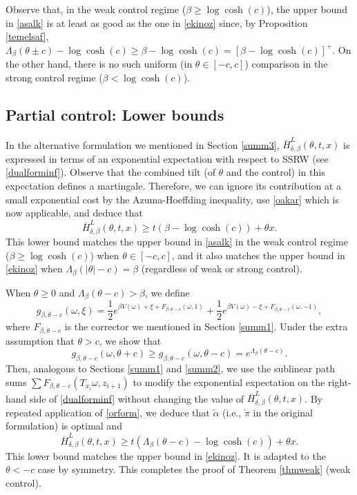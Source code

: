 \documentclass[a4paper]{amsart}
\numberwithin{equation}{section}
\theoremstyle{plain}
\theoremstyle{remark}
\begin{document}
Observe that, in the weak control regime ($\beta\ge\log\cosh(c)$), the 
upper bound in \eqref{asalk} is at least as good as the one in \eqref{ekinoz} 
since,
{}{by Proposition \ref{temelsaf},}
$\Lambda_\beta(\theta \pm c) - \log\cosh(c) \ge \beta - \log\cosh(c) = [\beta - \log\cosh(c)]^+$. On the other hand, there is no such uniform (in $\theta\in[-c,c]$) comparison in the strong control regime ($\beta<\log\cosh(c)$).

\subsection{Partial control: Lower bounds}

In the alternative formulation we mentioned in Section \ref{summ3}, $\overline H_{\delta,\beta}^L(\theta,t,x)$ is expressed in terms of an exponential expectation with respect to SSRW (see \eqref{dualforminf}). Observe that the combined tilt (of $\theta$ and the control) in this expectation defines a martingale. Therefore, we can ignore its contribution at a small exponential cost by the Azuma-Hoeffding inequality, use \eqref{oakar} which is now applicable, and deduce that
$$\overline H_{\delta,\beta}^L(\theta,t,x) \ge t(\beta - \log\cosh(c)) + \theta x.$$
This lower bound matches the upper bound in \eqref{asalk} in the weak control regime ($\beta\ge\log\cosh(c)$) when $\theta\in[-c,c]$, and it also matches the upper bound in \eqref{ekinoz} when $\Lambda_\beta(|\theta| - c) = \beta$ (regardless of weak or strong control).

When $\theta\ge0$ and $\Lambda_\beta(\theta-c)>\beta$, we define
$$g_{\beta,\theta-c}(\omega,\xi) = \frac1{2}e^{\beta V(\omega) + \xi + F_{\beta,\theta-c}(\omega,1)} + \frac1{2}e^{\beta V(\omega) - \xi + F_{\beta,\theta-c}(\omega,-1)},$$
where $F_{\beta,\theta-c}$ is the corrector we mentioned in Section \ref{summ1}. Under the extra assumption that $\theta>c$, we show that
\begin{equation}\label{orform}
g_{\beta,\theta-c}(\omega,\theta+c) \ge g_{\beta,\theta-c}(\omega,\theta-c) = e^{\Lambda_\beta(\theta-c)}.
\end{equation}
Then, analogous to Sections \ref{summ1} and \ref{summ2}, we use the sublinear path sums $\sum F_{\beta,\theta-c}(T_{x_i}\omega,z_{i+1})$ to modify the exponential expectation on the right-hand side of \eqref{dualforminf}  without changing the value of $\overline H_{\delta,\beta}^L(\theta,t,x)$. By repeated application of \eqref{orform}, we deduce that ${\overleftarrow\alpha}$ (i.e., ${\overleftarrow\pi}$ in the original formulation) is optimal and
\begin{equation}\label{farukg}
\overline H_{\delta,\beta}^L(\theta,t,x) \ge t(\Lambda_\beta(\theta-c) - \log\cosh(c)) + \theta x.
\end{equation}
This lower bound matches the upper bound in \eqref{ekinoz}. It is adapted to the $\theta<-c$ case by symmetry. This completes the proof of Theorem \ref{thmweak} (weak control).
\end{document}
